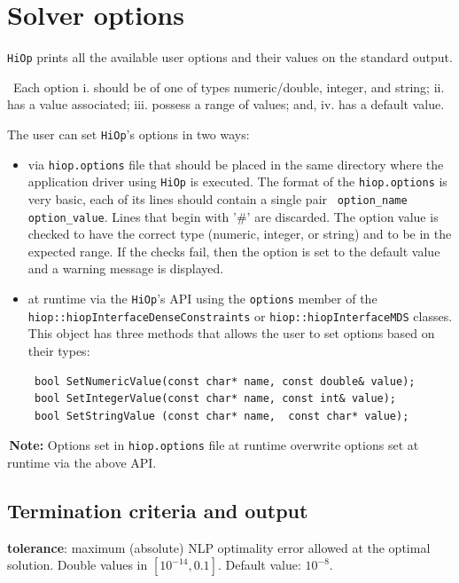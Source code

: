 \documentclass[11pt]{article}
\newcounter{line}
\newcommand{\warningSymbol}{\raisebox{0.9\depth}{\danger}}
\newcommand{\warningcp}[1]{%
        \smallskip \noindent \textcolor{warningColorText}{\warningSymbol{}}\,\textbf{#1} %
    }
\newcommand{\Hi}{\texttt{HiOp}\xspace}
\begin{document}

\section{Solver options}
\Hi  prints all the available user options and their values on the standard output. 

\warningcp{} Each option i. should be of one of types numeric/double, integer, and string; ii. has a value associated; iii. possess a range of values;  and, iv. has a default value. 

The user can set \Hi's options in two ways:
\begin{itemize}
\item via \texttt{hiop.options} file that should be placed in the same directory where the application driver using \Hi is executed. The format of the \texttt{hiop.options} is very basic, each of its lines should contain a single pair \texttt{ option\_name option\_value}. Lines that begin with '\#' are discarded. The option value is checked to have the correct type (numeric, integer, or string) and to be in the expected range. If the checks fail, then the option is set to the default value and a warning message is displayed.
\item at runtime via the \Hi's API using the \texttt{options} member of the \texttt{hiop::hiopInterfaceDenseConstraints} or \texttt{hiop::hiopInterfaceMDS} classes. This object has three methods that allows the user to set options based on their types:
\begin{lstlisting}
 bool SetNumericValue(const char* name, const double& value);
 bool SetIntegerValue(const char* name, const int& value);
 bool SetStringValue (const char* name,  const char* value);
\end{lstlisting}
\end{itemize}

\warningcp{Note:} Options set in \texttt{hiop.options} file at runtime overwrite options set at runtime via the above API.

\subsection{Termination criteria and output}

\noindent \textbf{tolerance}: maximum (absolute)  NLP optimality error allowed at the optimal solution. Double values in $[10^{-14},0.1]$. Default value: $10^{-8}$. 
\end{document}
